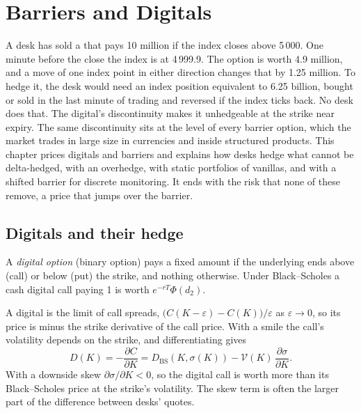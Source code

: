 \chapter{Barriers and Digitals}\label{ch:dv:barriers-and-digitals}

A desk has sold a  that pays 10 million if the index closes above 5\,000. One minute before the
close the index is at 4\,999.9. The option is worth 4.9 million, and a move of one index point in either
direction changes that by 1.25 million. To hedge it, the desk would need an index position equivalent to
6.25 billion, bought or sold in the last minute of trading and reversed if the index ticks back. No desk does
that. The digital's discontinuity makes it unhedgeable at the strike near expiry. The same discontinuity sits
at the level of every barrier option, which the market trades in large size in currencies and inside
structured products. This chapter prices digitals and barriers and explains how desks hedge what cannot be
delta-hedged, with an overhedge, with static portfolios of vanillas, and with a shifted barrier for discrete
monitoring. It ends with the risk that none of these remove, a price that jumps over the barrier.

\section{Digitals and their hedge}

\begin{definition}\label{def:dv:barriers-and-digitals:digital}
A \emph{digital option} (binary option) pays a fixed amount if the underlying ends above
(call) or below (put) the strike, and nothing otherwise. Under Black--Scholes a cash digital call paying 1 is
worth $e^{-rT}\Phi(d_2)$.
\end{definition}

A digital is the limit of call spreads, $\bigl(C(K-\varepsilon)-C(K)\bigr)/\varepsilon$ as $\varepsilon\to0$,
so its price is minus the strike derivative of the call price. With a smile the call's volatility depends on the
strike, and differentiating gives
\[
D(K)=-\frac{\partial C}{\partial K}=D_{\mathrm{BS}}(K,\sigma(K))-\mathcal V(K)\,\frac{\partial\sigma}{\partial K}.
\]
With a downside skew $\partial\sigma/\partial K<0$, so the digital call is worth more than its Black--Scholes price
at the strike's volatility. The skew term is often the larger part of the difference between desks' quotes.

